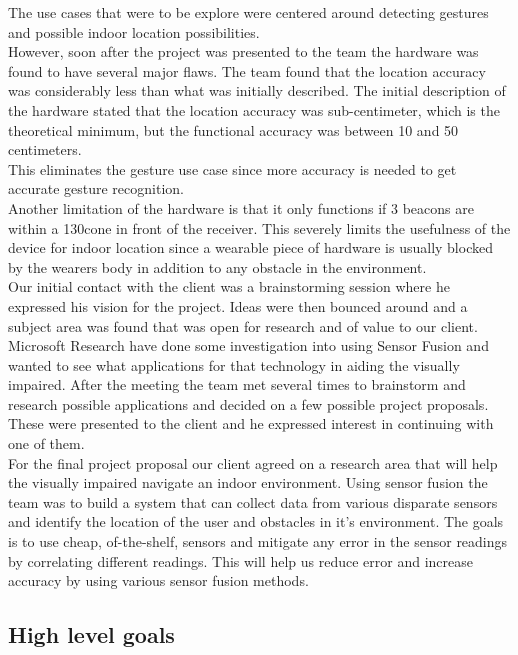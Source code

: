 \documentclass[prodmode,acmtecs]{acmsmall} %
\begin{document}
The use cases that were to be explore were centered around detecting gestures and possible indoor location possibilities.\\
However, soon after the project was presented to the team the hardware was found to have several major flaws. The team found that the location accuracy was considerably less than what was initially described. The initial description of the hardware stated that the location accuracy was sub-centimeter, which is the theoretical minimum, but the functional accuracy was between 10 and 50 centimeters.\\
This eliminates the gesture use case since more accuracy is needed to get accurate gesture recognition.\\
Another limitation of the hardware is that it only functions if 3 beacons are within a 130\degree cone in front of the receiver. This severely limits the usefulness of the device for indoor location since a wearable piece of hardware is usually blocked by the wearers body in addition to any obstacle in the environment.\\
Our initial contact with the client was a brainstorming session where he expressed his vision for the project. Ideas were then bounced around and a subject area was found that was open for research and of value to our client.\\
Microsoft Research have done some investigation into using Sensor Fusion
and wanted to see what applications for that technology in aiding the visually impaired.
After the meeting the team met several times to brainstorm and research possible applications and decided on a few possible project proposals.
These were presented to the client and he expressed interest in continuing with one of them.\\
For the final project proposal our client agreed on a research area that will help the visually impaired navigate an indoor environment.
Using sensor fusion the team was to build a system that can collect data from various disparate sensors and identify the location of the user and obstacles in it's environment.
The goals is to use cheap, of-the-shelf, sensors and mitigate any error in the sensor readings by correlating different readings. This will help us reduce error and increase accuracy by using various sensor fusion methods.

\subsection{High level goals}
\end{document}
